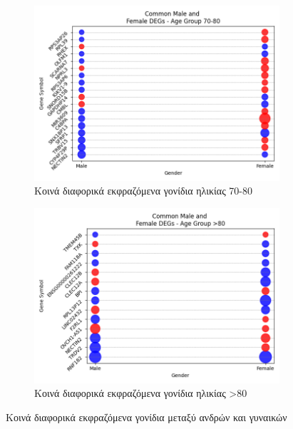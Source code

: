 \documentclass[12pt]{report}
\begin{document}
\begin{figure}[ht]
                        \vspace{0.5cm} %
                        
                        \begin{subfigure}[b]{0.48\textwidth}
                            \includegraphics[width=\textwidth]{Chapter-3/bubbleplot_combined_70-80.png}
                            \caption{Κοινά διαφορικά εκφραζόμενα γονίδια ηλικίας 70-80}
                            \label{fig:bubbleplot_combined_70-80}
                        \end{subfigure}
                        \hfill
                        \begin{subfigure}[b]{0.48\textwidth}
                            \includegraphics[width=\textwidth]{Chapter-3/bubbleplot_combined_>80.png}
                            \caption{Κοινά διαφορικά εκφραζόμενα γονίδια ηλικίας >80}
                            \label{fig:bubbleplot_combined_>80}
                        \end{subfigure}
                        
                        \caption{Κοινά διαφορικά εκφραζόμενα γονίδια μεταξύ ανδρών και γυναικών}
                        \label{fig:common-genes-across-genders-per-age-group}
                    \end{figure}
\end{document}
